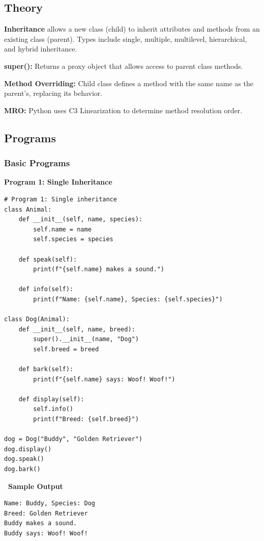 \documentclass[12pt,a4paper]{article}
\newcommand{\outhead}{\noindent\colorbox{cmrgreen!25}%
  {\textbf{\small\color{cmrdark}~Sample Output~}}\par\vspace{-1pt}}
\begin{document}
\subsection{Theory}

\textbf{Inheritance} allows a new class (child) to inherit attributes and methods from an existing class (parent). Types include single, multiple, multilevel, hierarchical, and hybrid inheritance.

\textbf{super():} Returns a proxy object that allows access to parent class methods.

\textbf{Method Overriding:} Child class defines a method with the same name as the parent's, replacing its behavior.

\textbf{MRO:} Python uses C3 Linearization to determine method resolution order.

\subsection{Programs}
\subsubsection{Basic Programs}

\textbf{Program 1: Single Inheritance}

\begin{lstlisting}
# Program 1: Single inheritance
class Animal:
    def __init__(self, name, species):
        self.name = name
        self.species = species

    def speak(self):
        print(f"{self.name} makes a sound.")

    def info(self):
        print(f"Name: {self.name}, Species: {self.species}")

class Dog(Animal):
    def __init__(self, name, breed):
        super().__init__(name, "Dog")
        self.breed = breed

    def bark(self):
        print(f"{self.name} says: Woof! Woof!")

    def display(self):
        self.info()
        print(f"Breed: {self.breed}")

dog = Dog("Buddy", "Golden Retriever")
dog.display()
dog.speak()
dog.bark()
\end{lstlisting}

\outhead
\begin{lstlisting}[style=outputstyle]
Name: Buddy, Species: Dog
Breed: Golden Retriever
Buddy makes a sound.
Buddy says: Woof! Woof!
\end{lstlisting}
\end{document}
